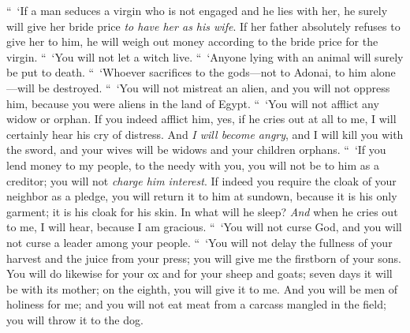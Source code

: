 \begin{biblechapter}
 “ ‘If a man seduces a virgin who is not engaged and he lies with her, he surely will give her bride price \textit{to have her as his wife}.
\verse If her father absolutely refuses to give her to him, he will weigh out money according to the bride price for the virgin.
\verse “ ‘You will not let a witch live.
\verse “ ‘Anyone lying with an animal will surely be put to death.
\verse “ ‘Whoever sacrifices to the gods—not to Adonai, to him alone—will be destroyed.
 “ ‘You will not mistreat an alien, and you will not oppress him, because you were aliens in the land of Egypt.
\verse “ ‘You will not afflict any widow or orphan.
\verse If you indeed afflict him, yes, if he cries out at all to me, I will certainly hear his cry of distress.
\verse And \textit{I will become angry}, and I will kill you with the sword, and your wives will be widows and your children orphans.
\verse “ ‘If you lend money to my people, to the needy with you, you will not be to him as a creditor; you will not \textit{charge him interest}.
\verse If indeed you require the cloak of your neighbor as a pledge, you will return it to him at sundown,
\verse because it is his only garment; it is his cloak for his skin. In what will he sleep? \textit{And} when he cries out to me, I will hear, because I am gracious.
 “ ‘You will not curse God, and you will not curse a leader among your people.
\verse “ ‘You will not delay the fullness of your harvest and the juice from your press; you will give me the firstborn of your sons.
\verse You will do likewise for your ox and for your sheep and goats; seven days it will be with its mother; on the eighth, you will give it to me.
\verse And you will be men of holiness for me; and you will not eat meat from a carcass mangled in the field; you will throw it to the dog.
\end{biblechapter}

